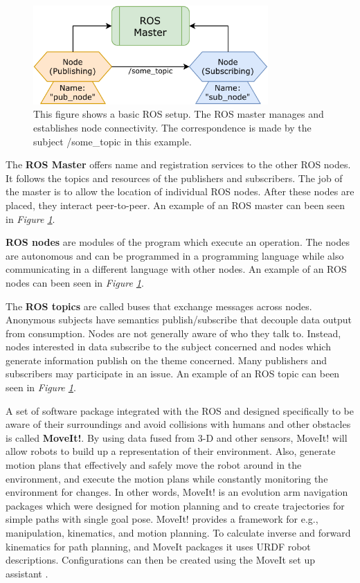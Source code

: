 \begin{figure}[h]%
    \centering
    \includegraphics[width=0.8\textwidth]{graphics/rosmaster.pdf}
    \caption{This figure shows a basic ROS setup. The ROS master manages and establishes node connectivity. The correspondence is made by the subject /some\_topic in this example.}
    \label{fig:rosmaster}
\end{figure}

The \textbf{ROS Master} offers name and registration services to the other ROS nodes. It follows the topics and resources of the publishers and subscribers. The job of the master is to allow the location of individual ROS nodes. After these nodes are placed, they interact peer-to-peer\cite{noauthor_master_nodate}. An example of an ROS master can been seen in \textit{Figure \ref{fig:rosmaster}}.


\textbf{ROS nodes} are modules of the program which execute an operation. 
The nodes are autonomous and can be programmed in a programming language while also communicating in a different language with other nodes\cite{noauthor_rostutorialsunderstandingnodes_nodate}. An example of an ROS nodes can been seen in \textit{Figure \ref{fig:rosmaster}}.


The \textbf{ROS topics} are called buses that exchange messages across nodes. Anonymous subjects have semantics publish/subscribe that decouple data output from consumption. Nodes are not generally aware of who they talk to. Instead, nodes interested in data subscribe to the subject concerned and nodes which generate information publish on the theme concerned. Many publishers and subscribers may participate in an issue\cite{noauthor_topics_nodate}. An example of an ROS topic can been seen in \textit{Figure \ref{fig:rosmaster}}.

A set of software package integrated with the ROS and designed specifically to be aware of their surroundings and avoid collisions with humans and other obstacles is called \textbf{MoveIt!}. By using data fused from 3-D and other sensors, MoveIt! will allow robots to build up a representation of their environment. Also, generate motion plans that effectively and safely move the robot around in the environment, and execute the motion plans while constantly monitoring the environment for changes. In other words, MoveIt! is an evolution arm navigation packages which were designed for motion planning and to create trajectories for simple paths with single goal pose. MoveIt! provides a framework for e.g., manipulation, kinematics, and motion planning. To calculate inverse and forward kinematics for path planning, and MoveIt packages it uses URDF robot descriptions. Configurations can then be created using the MoveIt set up assistant \cite{chitta_moveitros_2012}.

